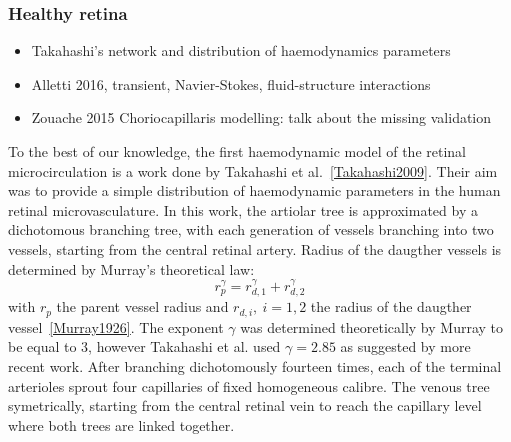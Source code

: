 \documentclass[12pt,a4paper]{article}
\begin{document}
\subsubsection{Healthy retina}
\begin{itemize}
\item Takahashi's network and distribution of haemodynamics parameters
\item Alletti 2016, transient, Navier-Stokes, fluid-structure interactions
\item Zouache 2015 Choriocapillaris modelling: talk about the missing validation
\end{itemize}

To the best of our knowledge, the first haemodynamic model of the retinal microcirculation is a work done by Takahashi et al.~\ref{Takahashi2009}.
Their aim was to provide a simple distribution of haemodynamic parameters in the human retinal microvasculature.
In this work, the artiolar tree is approximated by a dichotomous branching tree, with each generation of vessels branching into two vessels, starting from the central retinal artery.
Radius of the daugther vessels is determined by Murray's theoretical law:
\begin{equation}
  \label{eq:MurrayLaw}
  r_p^\gamma = r_{d,1}^\gamma + r_{d,2}^\gamma
\end{equation}
with $r_p$ the parent vessel radius and $r_{d,i},~i=1,2$ the radius of the daugther vessel~\ref{Murray1926}.
The exponent $\gamma$ was determined theoretically by Murray to be equal to $3$, however Takahashi et al. used $\gamma=2.85$ as suggested by more recent work.
After branching dichotomously fourteen times, each of the terminal arterioles sprout four capillaries of fixed homogeneous calibre. 
The venous tree symetrically, starting from the central retinal vein to reach the capillary level where both trees are linked together.
\end{document}
